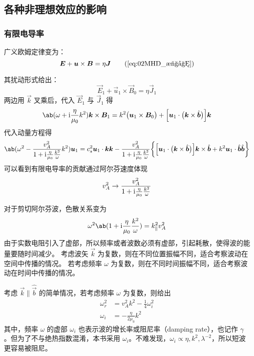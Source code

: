 \subsection{各种非理想效应的影响}

\subsubsection{有限电导率}

广义欧姆定律变为：
\begin{equation}
\vec{E} + \vec{u} \times \vec{B} = \eta \vec{J} \tag{\ref{eq:02MHD_欧姆}}
\end{equation}

其扰动形式给出：
\begin{equation}
\vec{E}_1 + \vec{u}_1 \times \vec{B}_0 = \eta \vec{J}_1
\end{equation}
两边用 $\vec{k}$ 叉乘后，代入 $\vec{E}_1$ 与 $\vec{J}_1$ 得
\begin{equation}
\ab( \omega + \im \frac{\eta}{\mu_0} k^2 ) \vec{k} \times \vec{B}_1
= k^2 \big( \vec{u}_1 \times \vec{B}_0 \big) + \Big[ \vec{u}_1 \cdot \big(\vec{k} \times \hat{\vec{b}} \big) \Big] \vec{k}
\end{equation}
代入动量方程得
\begin{equation}
\ab(\omega^2
    - \frac{v_A^2}{1 + \im \frac{\eta}{\mu_0}\frac{k^2}{\omega}} k^2
) \vec{u}_1
= c_s^2 \vec{u}_1 \cdot \vec{k} \vec{k}
- \frac{v_A^2}{1 + \im \frac{\eta}{\mu_0}\frac{k^2}{\omega}} \bigg\{
    \Big[ \vec{u}_1 \cdot \big(\vec{k} \times \hat{\vec{b}} \big) \Big] \vec{k} \times \hat{\vec{b}}
    + k^2 \vec{u}_1 \cdot \hat{\vec{b}} \hat{\vec{b}}
\bigg\}
\end{equation}
可以看到有限电导率的贡献通过阿尔芬速度体现
\begin{equation}
v_A^2 \rightarrow \frac{v_A^2}{1 + \mathrm{i} \frac{\eta}{\mu_0}\frac{k^2}{\omega}}
\end{equation}

对于剪切阿尔芬波，色散关系变为
\begin{equation}
\omega^2 \ab(1 + \im \frac{\eta}{\mu_0}\frac{k^2}{\omega}) = k_\parallel^2 v_A^2
\end{equation}
由于实数电阻引入了虚部，所以频率或者波数必须有虚部，引起耗散，使得波的能量要随时间减少。
考虑波矢 $\vec{k}$ 为复数，则在不同位置振幅不同，适合考察波动在空间中传播的情况。
若考虑频率 $\omega$ 为复数，则在不同时间振幅不同，适合考察波动在时间中传播的情况。

考虑 $\vec{k} \parallel \hat{\vec{b}}$ 的简单情况，若考虑频率 $\omega$ 为复数，则给出
\begin{subequations}\begin{align}
\omega_r^2 &= v_A^2 k^2 - \frac{1}{4} \omega_i^2 \\
\omega_i &= - \frac{\eta}{2 \mu_0} k^2
\end{align}\end{subequations}
其中，频率 $\omega$ 的虚部 $\omega_i$ 也表示波的增长率或阻尼率（damping rate），也记作 $\gamma$。但为了不与绝热指数混淆，本书采用 $\omega_i$。不难发现，$\omega_i \propto \eta, k^2, \lambda^{-2}$，所以短波更容易被阻尼。

